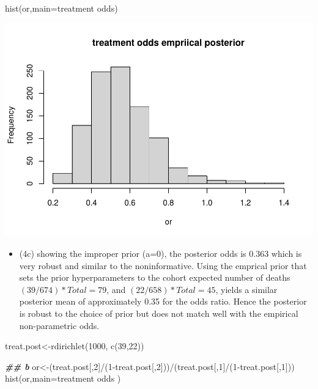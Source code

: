 \documentclass[
]{book}
\newenvironment{Shaded}{\begin{snugshade}}{\end{snugshade}}
\newcommand{\AttributeTok}[1]{\textcolor[rgb]{0.77,0.63,0.00}{#1}}
\newcommand{\DecValTok}[1]{\textcolor[rgb]{0.00,0.00,0.81}{#1}}
\newcommand{\DocumentationTok}[1]{\textcolor[rgb]{0.56,0.35,0.01}{\textbf{\textit{#1}}}}
\newcommand{\FunctionTok}[1]{\textcolor[rgb]{0.00,0.00,0.00}{#1}}
\newcommand{\NormalTok}[1]{#1}
\newcommand{\OtherTok}[1]{\textcolor[rgb]{0.56,0.35,0.01}{#1}}
\newcommand{\SpecialCharTok}[1]{\textcolor[rgb]{0.00,0.00,0.00}{#1}}
\newcommand{\StringTok}[1]{\textcolor[rgb]{0.31,0.60,0.02}{#1}}
\providecommand{\tightlist}{%
  \setlength{\itemsep}{0pt}\setlength{\parskip}{0pt}}
\theoremstyle{definition}
\theoremstyle{definition}
\theoremstyle{definition}
\theoremstyle{definition}
\theoremstyle{remark}
\begin{document}
\begin{Shaded}
\begin{Highlighting}[]
  \FunctionTok{hist}\NormalTok{(or,}\AttributeTok{main=}\StringTok{\textquotesingle{}treatment odds\textquotesingle{}}\NormalTok{)}
\end{Highlighting}
\end{Shaded}

\includegraphics{_main_files/figure-latex/unnamed-chunk-34-1.pdf}

\begin{itemize}
\tightlist
\item
  (4c) showing the improper prior (a=0), the posterior odds is 0.363 which is very robust and similar to the noninformative. Using the emprical prior that sets the prior hyperparameters to the cohort expected number of deaths \((39/674)*Total = 79\), and \((22/658)*Total = 45\), yields a similar posterior mean of approximately 0.35 for the odds ratio. Hence the posterior is robust to the choice of prior but does not match well with the empirical non-parametric odds.
\end{itemize}

\begin{Shaded}
\begin{Highlighting}[]
\NormalTok{ treat.post}\OtherTok{\textless{}{-}}\FunctionTok{rdirichlet}\NormalTok{(}\DecValTok{1000}\NormalTok{, }\FunctionTok{c}\NormalTok{(}\DecValTok{39}\NormalTok{,}\DecValTok{22}\NormalTok{))}
 
  
  \DocumentationTok{\#\# b}
\NormalTok{  or}\OtherTok{\textless{}{-}}\NormalTok{(treat.post[,}\DecValTok{2}\NormalTok{]}\SpecialCharTok{/}\NormalTok{(}\DecValTok{1}\SpecialCharTok{{-}}\NormalTok{treat.post[,}\DecValTok{2}\NormalTok{]))}\SpecialCharTok{/}\NormalTok{(treat.post[,}\DecValTok{1}\NormalTok{]}\SpecialCharTok{/}\NormalTok{(}\DecValTok{1}\SpecialCharTok{{-}}\NormalTok{treat.post[,}\DecValTok{1}\NormalTok{]))}
  \FunctionTok{hist}\NormalTok{(or,}\AttributeTok{main=}\StringTok{\textquotesingle{}treatment odds \textquotesingle{}}\NormalTok{)}
\end{Highlighting}
\end{Shaded}
\end{document}
